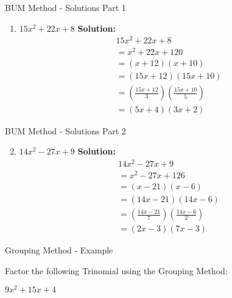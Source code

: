 \documentclass[aspectratio=169]{beamer}
\begin{document}
\begin{frame}{BUM Method - Solutions Part 1}
    \begin{tcolorbox}[colback=lightgray,colframe=accent,title=Detailed Solutions]
        \footnotesize
        \begin{enumerate}
            \setlength{\itemsep}{0.5em}
            \item $15x^2 + 22x + 8$
            \quad \textbf{Solution:}
            \begin{align*}
                & 15x^2 + 22x + 8 \\
                &= x^2 + 22x + 120 \\
                &= (x + 12)(x + 10) \\
                &= (15x + 12)(15x + 10) \\
                &= \left(\frac{15x + 12}{3}\right)\left(\frac{15x + 10}{5}\right) \\
                &= (5x + 4)(3x + 2)
            \end{align*}
        \end{enumerate}
    \end{tcolorbox}
\end{frame}

\begin{frame}{BUM Method - Solutions Part 2}
    \begin{tcolorbox}[colback=lightgray,colframe=accent,title=Detailed Solutions]
        \footnotesize
        \begin{enumerate}
            \setcounter{enumi}{1}
            \setlength{\itemsep}{0.5em}
            \item $14x^2 - 27x + 9$
            \quad \textbf{Solution:}
            \begin{align*}
                & 14x^2 - 27x + 9 \\
                &= x^2 - 27x + 126 \\
                &= (x - 21)(x - 6) \\
                &= (14x - 21)(14x - 6) \\
                &= \left(\frac{14x - 21}{7}\right)\left(\frac{14x - 6}{2}\right) \\
                &= (2x - 3)(7x - 3)
            \end{align*}
        \end{enumerate}
    \end{tcolorbox}
\end{frame}

\begin{frame}{Grouping Method - Example}
    \begin{tcolorbox}[colback=lightgray,colframe=primary,title=Example: Factor using Grouping Method]
        \footnotesize
        Factor the following Trinomial using the Grouping Method:
        
        $9x^2 + 15x + 4$
    \end{tcolorbox}
\end{frame}
\end{document}
